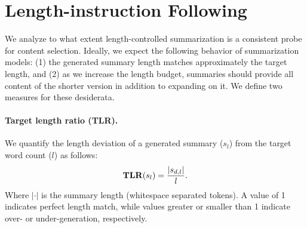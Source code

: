 \section{Length-instruction Following}
\label{sec:appendix-length-analysis}
We analyze to what extent length-controlled summarization is a consistent probe for content selection.
Ideally, we expect the following behavior of summarization models: (1) the generated summary length matches approximately the target length, and (2) as we increase the length budget, summaries should provide all content of the shorter version in addition to expanding on it.
We define two measures for these desiderata.

\paragraph{Target length ratio (TLR).}
We quantify the length deviation of a generated summary ($s_{l}$) from the target word count ($l$) as follows:
%
\begin{equation}
\text{\textbf{TLR}}(s_{l}) = \frac{|s_{d,l}|}{l}.
\end{equation}
%
Where $|\cdot|$ is the summary length (whitespace separated tokens). A value of 1 indicates perfect length match, while values greater or smaller than 1 indicate over- or under-generation, respectively.

